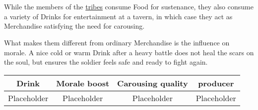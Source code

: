 \section{}\label{ch:Goods:Drink}

While the members of the \hyperref[ch:Tribes]{tribes} consume \gls{Food} for
sustenance, they also consume a variety of \glspl{Drink} for entertainment at a
tavern, in which case they act as \gls{Merchandise} satisfying the need for
carousing.

What makes them different from ordinary \gls{Merchandise} is the influence on
morale. A nice cold or warm \gls{Drink} after a heavy battle does not heal the
scars on the soul, but ensures the soldier feels safe and ready to fight again.

\begin{longtable}{cccc}
	\toprule
	\Gls*{Drink} & Morale boost & Carousing quality & producer    \\
	\midrule
	Placeholder  & Placeholder  & Placeholder       & Placeholder \\
	\bottomrule
\end{longtable}
